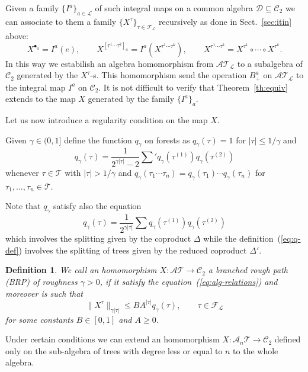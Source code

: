 \documentclass[a4paper,11pt,reqno]{article}
\newcommand{\1}{{\bf 1}}
\newcommand{\FF}{\mathcal{F}}
\newcommand{\CC}{\mathcal{C}}
\newcommand{\DD}{\mathcal{D}}
\newcommand{\LL}{\mathcal{L}}
\newcommand{\cl}{\mathcal L}
\newtheorem{definition}[theorem]{Definition}
\newcommand{\TT}{\mathcal{T}}
\newcommand{\cA}{\mathcal{A}}
\newcommand{\troot}{\bullet}
\begin{document}
Given a family $\{I^a\}_{a\in\LL}$ of such integral maps on a common
algebra $\DD\subseteq \CC_{2}$ we can associate to them a family $\{X^{\tau}\}_{\tau\in\FF_\LL}$ recursively as done in Sect.~\ref{sec:itin} above:
$$
X^{\troot_a} = I^a(e), \qquad X^{[\tau^1 \cdots \tau^k]_a} = I^a(X^{\tau^1 \cdots \tau^k}), \qquad X^{\tau^1\cdots \tau^k}= X^{\tau^1}\circ \cdots \circ X^{\tau^k}.
$$   
In this way we estabilish an algebra homomorphism from $\cA\TT_\LL$ to
a subalgebra of $\CC_2$ generated by the $X^\tau$-s. This homomorphism
send the operation $B_+^a$ on $\cA\TT_\LL$ to the integral map $I^a$
on $\CC_2$. It is not difficult to verify that Theorem~\ref{th:equiv}
extends to the map $X$ generated by the family $\{I^a\}_a$.

Let us now introduce a regularity condition on the map $X$.

Given $\gamma \in (0,1]$ define the function $q_\gamma$ on forests as
 $q_\gamma(\tau) = 1$ for $|\tau| \le 1/\gamma$ and 
\begin{equation}
  \label{eq:q-def}
q_{\gamma}(\tau) = \frac{1}{2^{\gamma |\tau|}-2} \sum' q_\gamma(\tau^{(1)}) q_\gamma(\tau^{(2)})  
\end{equation}
whenever $\tau \in \TT$ with $|\tau| > 1/\gamma$ and  $q_\gamma(\tau_1 \cdots \tau_n) = q_\gamma(\tau_1) \cdots q_\gamma(\tau_n)$ for $\tau_1,\dots,\tau_n \in \TT$.

Note that $q_{\gamma}$ satisfy also the equation
$$
q_{\gamma}(\tau) = \frac{1}{2^{\gamma |\tau|}} \sum q_\gamma(\tau^{(1)}) q_\gamma(\tau^{(2)})
$$
which involves the splitting given by the coproduct $\Delta$ while the definition~(\ref{eq:q-def}) involves the splitting of trees given by the reduced coproduct $\Delta'$.


\begin{definition}
 We call an homomorphism $X :\cA \TT \to \CC_2$ a  \emph{branched
 rough path} (BRP) of roughness $\gamma> 0$, if it satisfy the equation~(\ref{eq:alg-relations})
 and moreover is such that
\begin{equation}
  \label{eq:brp-small}
 \| X^\tau\|_{\gamma |\tau|} \le B A^{|\tau|} q_\gamma(\tau), \qquad \tau \in \FF_\cl
\end{equation}
for some constants $B \in [0,1]$ and $A \ge 0$.
\end{definition}

Under certain conditions we can extend an homomorphism $X:
\cA_n \TT \to \CC_2$ defined only on the sub-algebra of trees with
degree less or equal to $n$ to the whole algebra.
\end{document}
